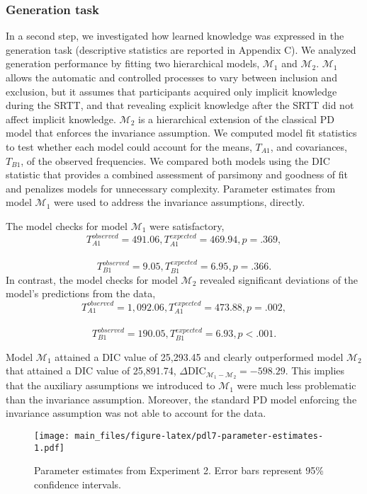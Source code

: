 \documentclass[man]{apa6}
\theoremstyle{definition}
\theoremstyle{definition}
\theoremstyle{definition}
\theoremstyle{remark}
\begin{document}
\subsubsection{Generation task}\label{generation-task-1}

In a second step, we investigated how learned knowledge was expressed in
the generation task (descriptive statistics are reported in Appendix C).
We analyzed generation performance by fitting two hierarchical models,
\(\mathcal{M}_1\) and \(\mathcal{M}_2\). \(\mathcal{M}_1\) allows the
automatic and controlled processes to vary between inclusion and
exclusion, but it assumes that participants acquired only implicit
knowledge during the SRTT, and that revealing explicit knowledge after
the SRTT did not affect implicit knowledge. \(\mathcal{M}_2\) is a
hierarchical extension of the classical PD model that enforces the
invariance assumption. We computed model fit statistics to test whether
each model could account for the means, \(T_{A1}\), and covariances,
\(T_{B1}\), of the observed frequencies. We compared both models using
the DIC statistic that provides a combined assessment of parsimony and
goodness of fit and penalizes models for unnecessary complexity.
Parameter estimates from model \(\mathcal{M}_1\) were used to address
the invariance assumptions, directly.

The model checks for model \(\mathcal{M}_1\) were satisfactory,
\[T_{A1}^{observed} = 491.06, T_{A1}^{expected} = 469.94, p = .369,\]~
\[T_{B1}^{observed} = 9.05, T_{B1}^{expected} = 6.95, p = .366.\] In
contrast, the model checks for model \(\mathcal{M}_2\) revealed
significant deviations of the model's predictions from the data,
\[T_{A1}^{observed} = 1,092.06, T_{A1}^{expected} = 473.88, p = .002,\]~
\[T_{B1}^{observed} = 190.05, T_{B1}^{expected} = 6.93, p < .001.\]

Model \(\mathcal{M}_1\) attained a DIC value of 25,293.45 and clearly
outperformed model \(\mathcal{M}_2\) that attained a DIC value of
25,891.74,
\(\Delta \textrm{DIC}_{\mathcal{M}_1 - \mathcal{M}_2} = -598.29\). This
implies that the auxiliary assumptions we introduced to
\(\mathcal{M}_1\) were much less problematic than the invariance
assumption. Moreover, the standard PD model enforcing the invariance
assumption was not able to account for the data.

\begin{figure}[htbp]
\centering
\texttt{[image: main\_files/figure-latex/pdl7-parameter-estimates-1.pdf]}
\caption{\label{fig:pdl7-parameter-estimates}Parameter estimates from
Experiment 2. Error bars represent 95\% confidence intervals.}
\end{figure}
\end{document}
